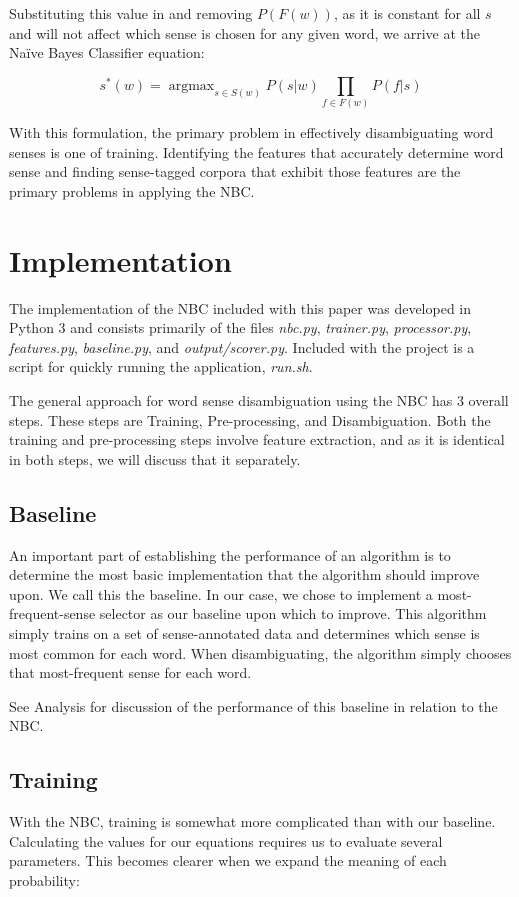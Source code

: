 \documentclass[11pt]{article}
\DeclareMathOperator*{\argmax}{argmax}
\begin{document}
Substituting this value in and removing $P(F(w))$, as it is constant for all $s$ and will not affect which sense is chosen for any given word, we arrive at the Na\"ive Bayes Classifier equation:

\begin{equation} \label{eq:nbc}
s^*(w) = \argmax_{s \in S(w)} P(s|w)\!\!\prod_{f \in F(w)}\!\!P(f|s)
\end{equation}

With this formulation, the primary problem in effectively disambiguating word senses is one of training. Identifying the features that accurately determine word sense and finding sense-tagged corpora that exhibit those features are the primary problems in applying the NBC.

\section{Implementation}
The implementation of the NBC included with this paper was developed in Python 3 and consists primarily of the files \emph{nbc.py}, \emph{trainer.py}, \emph{processor.py}, \emph{features.py}, \emph{baseline.py}, and \emph{output/scorer.py}. Included with the project is a script for quickly running the application, \emph{run.sh}.

The general approach for word sense disambiguation using the NBC has 3 overall steps. These steps are Training, Pre-processing, and Disambiguation. Both the training and pre-processing steps involve feature extraction, and as it is identical in both steps, we will discuss that it separately.

\subsection{Baseline}
An important part of establishing the performance of an algorithm is to determine the most basic implementation that the algorithm should improve upon. We call this the baseline. In our case, we chose to implement a most-frequent-sense selector as our baseline upon which to improve. This algorithm simply trains on a set of sense-annotated data and determines which sense is most common for each word. When disambiguating, the algorithm simply chooses that most-frequent sense for each word.

See Analysis for discussion of the performance of this baseline in relation to the NBC.

\subsection{Training}
With the NBC, training is somewhat more complicated than with our baseline. Calculating the values for our equations requires us to evaluate several parameters. This becomes clearer when we expand the meaning of each probability:
\end{document}
